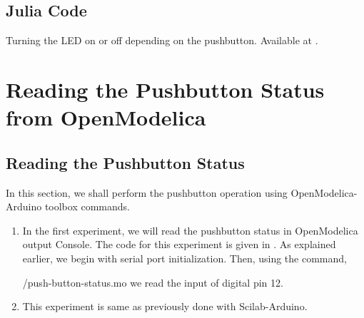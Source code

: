 \subsection{Julia Code}
\label{sec:push-julia-code}

\begin{juliacode}
\label{julia:push-100}

\end{juliacode}

\begin{juliacode}
  {Turning the LED on or off depending on the pushbutton.  Available at
  .}
\label{julia:push-200}

\end{juliacode}

\section{Reading the Pushbutton Status from OpenModelica}
\subsection{Reading the Pushbutton Status}
In this section, we shall perform the pushbutton operation using
OpenModelica-Arduino toolbox commands.
\begin{enumerate}
\item In the first experiment, we will read the pushbutton status in
  OpenModelica output Console. The code for this experiment is given in
  . As explained earlier, we begin with serial
  port initialization. Then, using the command,
  
  {\LocPushOpenModelicacode/push-button-status.mo} we read the input of
  digital pin 12. 
\item This experiment is same as previously done with Scilab-Arduino.
\end{enumerate}



